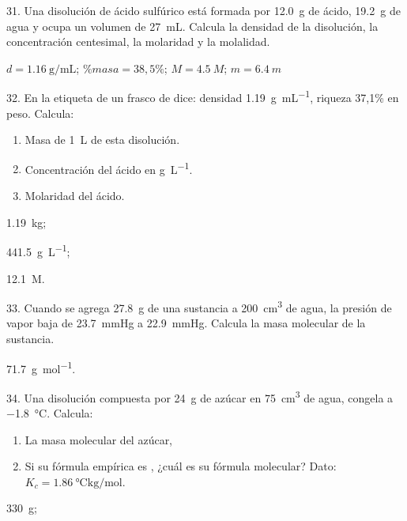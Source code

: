 \documentclass[11pt]{article}
\begin{document}
\begin{multicols}{2}
\begin{exercise}
  31. Una disolución de ácido sulfúrico está formada por \SI{12.0}{\gram} de
  ácido, \SI{19.2}{\gram} de agua y ocupa un volumen de \SI{27}{\milli\liter}. Calcula la densidad de la disolución, la concentración centesimal, la molaridad y la molalidad.
\end{exercise}
\begin{solution}
  $d = \SI{1.16}{\gram\per\milli\liter}$; $\%masa= 38,5\%$; $M= \SI{4.5}{M}$; $m= \SI{6.4}{m}$
\end{solution}

\begin{exercise}
  32. En la etiqueta de un frasco de  dice: densidad \SI{1.19}{\gram\per\milli\liter}, riqueza 37,1\% en peso. Calcula:
  \begin{enumerate}
    \item Masa de \SI{1}{\liter} de esta disolución.
    \item Concentración del ácido en \si{\gram\per\liter}.
    \item Molaridad del ácido.
  \end{enumerate}
\end{exercise}
\begin{solution}
  \begin{enumerate*}
    \item \SI{1,19}{\kilo\gram};
    \item \SI{441,5}{\gram\per\liter}; %
    \item \SI{12,1}{M}.
  \end{enumerate*}
\end{solution}

\begin{exercise}
  33. Cuando se agrega \SI{27.8}{\gram} de una sustancia a \SI{200}{\cubic\centi\meter} de agua, la presión de vapor baja de \SI{23.7}{\mmHg} a \SI{22.9}{\mmHg}. Calcula la masa molecular de la sustancia.
\end{exercise}
\begin{solution}
  \SI{71.7}{\gram\per\mole}.
\end{solution}

\begin{exercise}
  34. Una disolución compuesta por \SI{24}{\gram} de azúcar en \SI{75}{\cubic\centi\meter} de agua, congela a \SI{-1.8}{\celsius}. Calcula:
  \begin{enumerate}
    \item La masa molecular del azúcar,
    \item Si su fórmula empírica es , ¿cuál es su fórmula molecular? Dato: $K_c = \SI{1.86}{\celsius\kilo\gram\per\mole}$.
  \end{enumerate}
\end{exercise}
\begin{solution}
  \begin{enumerate*}
    \item \SI{330}{\gram};
    \item {}
  \end{enumerate*}
\end{solution}


\end{multicols}
\end{document}

